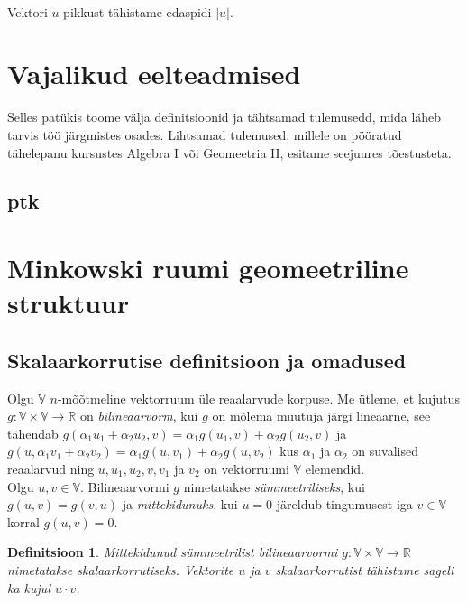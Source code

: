 \documentclass[a4paper,12pt]{article}
\newtheorem{definitsioon}{Definitsioon}[section]
\numberwithin{equation}{section}
\begin{document}
\paragraph{}
Vektori $u$ pikkust tähistame edaspidi $|u|$.
\newpage

\section{Vajalikud eelteadmised}

Selles patükis toome välja definitsioonid ja tähtsamad tulemusedd, mida läheb tarvis töö järgmistes osades. Lihtsamad tulemused, millele on pööratud tähelepanu kursustes Algebra I või Geomeetria II, esitame seejuures tõestusteta.

\subsection{ptk}

\newpage

\section{Minkowski ruumi geomeetriline struktuur}

\subsection{Skalaarkorrutise definitsioon ja omadused}

Olgu $\mathbb{V}$ $n$-mõõtmeline vektorruum üle reaalarvude korpuse. Me ütleme, et kujutus $g : \mathbb{V} \times \mathbb{V} \rightarrow \mathbb{R}$ on \emph{bilineaarvorm}, kui $g$ on mõlema muutuja järgi lineaarne, see tähendab $g \left( \alpha_1 u_1 + \alpha_2 u_2, v \right) = \alpha_1 g \left( u_1, v \right) + \alpha_2 g \left( u_2, v \right)$ ja $g \left( u, \alpha_1 v_1 + \alpha_2 v_2 \right) = \alpha_1 g \left( u, v_1 \right) + \alpha_2 g \left( u, v_2 \right)$ kus $\alpha_1$ ja $\alpha_2$ on suvalised reaalarvud ning $u, u_1, u_2, v, v_1$ ja $v_2$ on vektorruumi $\mathbb{V}$ elemendid. 
\\
Olgu $u, v \in \mathbb{V}$. Bilineaarvormi $g$ nimetatakse \emph{sümmeetriliseks}, kui $g \left( u, v \right) = g \left(v, u \right)$ ja \emph{mittekidunuks}, kui $u = 0$ järeldub tingumusest iga $v \in \mathbb{V}$ korral $g \left( u, v \right) = 0$.

\begin{definitsioon}
Mittekidunud sümmeetrilist bilineaarvormi $g: \mathbb{V} \times \mathbb{V} \rightarrow \mathbb{R}$ nimetatakse \emph{skalaarkorrutiseks}. Vektorite $u$ ja $v$ skalaarkorrutist tähistame sageli ka kujul $u \cdot v$.
\end{definitsioon}
\end{document}

